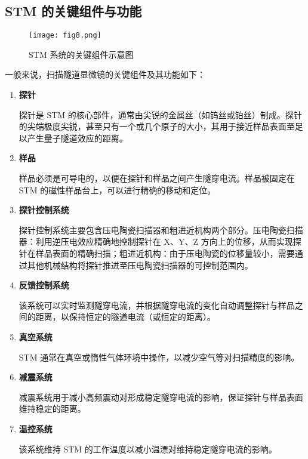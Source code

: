 \documentclass{article}
\begin{document}
\begin{spacing}{1.5}
	
	
	
	
	\subsection{STM 的关键组件与功能}
	\begin{figure}[htbp]
		\centering 
		\texttt{[image: fig8.png]}
		\caption{STM 系统的关键组件示意图}
	\end{figure}	
	一般来说，扫描隧道显微镜的关键组件及其功能如下：
	\begin{enumerate}
		\item \textbf{探针}\par
		\qquad 探针是 STM 的核心部件，通常由尖锐的金属丝（如钨丝或铂丝）制成。探针的尖端极度尖锐，甚至只有一个或几个原子的大小，其用于接近样品表面至足以产生量子隧道效应的距离。
		
		\item \textbf{样品}\par
		\qquad 样品必须是可导电的，以便在探针和样品之间产生隧穿电流。样品被固定在 STM 的磁性样品台上，可以进行精确的移动和定位。
		
		\item \textbf{探针控制系统}\par
		\qquad 探针控制系统主要包含压电陶瓷扫描器和粗进近机构两个部分。压电陶瓷扫描器：利用逆压电效应精确地控制探针在 X、Y、Z 方向上的位移，从而实现探针在样品表面的精确扫描；粗进近机构：由于压电陶瓷的位移量较小，需要通过其他机械结构将探针推进至压电陶瓷扫描器的可控制范围内。
		
		\item \textbf{反馈控制系统}\par
		\qquad 该系统可以实时监测隧穿电流，并根据隧穿电流的变化自动调整探针与样品之间的距离，以保持恒定的隧道电流（或恒定的距离）。
		
		\item \textbf{真空系统}\par
		\qquad STM 通常在真空或惰性气体环境中操作，以减少空气等对扫描精度的影响。
		
		\item \textbf{减震系统}\par
		\qquad 减震系统用于减小高频震动对形成稳定隧穿电流的影响，保证探针与样品表面维持稳定的距离。
		
		\item \textbf{温控系统}\par
		\qquad 该系统维持 STM 的工作温度以减小温漂对维持稳定隧穿电流的影响。
		

\end{enumerate}
\end{spacing}
\end{document}
